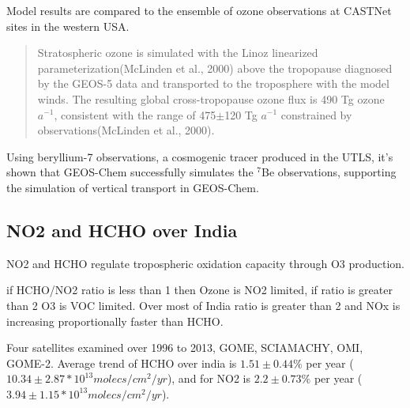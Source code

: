 Model results are compared to the ensemble of ozone observations at CASTNet sites in the western USA.

\begin{quote}
Stratospheric ozone is simulated with the Linoz linearized parameterization(McLinden et al., 2000) above the tropopause diagnosed by the GEOS-5 data and transported to the troposphere with the model winds. The resulting global cross-tropopause ozone flux is 490 Tg ozone $a^{−1}$, consistent with the range of 475$\pm$120 Tg $a^{−1}$ constrained by observations(McLinden et al., 2000).
\end{quote}

Using beryllium-7 observations, a cosmogenic tracer produced in the UTLS, it's shown that GEOS-Chem successfully simulates the $^7$Be observations, supporting the simulation of vertical transport in GEOS-Chem.

  
\subsection{NO2 and HCHO over India \cite{Mahajan_2015}}
NO2 and HCHO regulate tropospheric oxidation capacity through O3 production. 

if HCHO/NO2 ratio is less than 1 then Ozone is NO2 limited, if ratio is greater than 2 O3 is VOC limited.
Over most of India ratio is greater than 2 and NOx is increasing proportionally faster than HCHO.

Four satellites examined over 1996 to 2013, GOME, SCIAMACHY, OMI, GOME-2.
Average trend of HCHO over india is $1.51 \pm 0.44\%$ per year ($10.34 \pm 2.87 *10^{13} molecs/cm^2/yr$), and for NO2 is $2.2 \pm 0.73\%$ per year ($3.94 \pm 1.15 *10^{13} molecs/cm^2/yr$).
  
  
  
